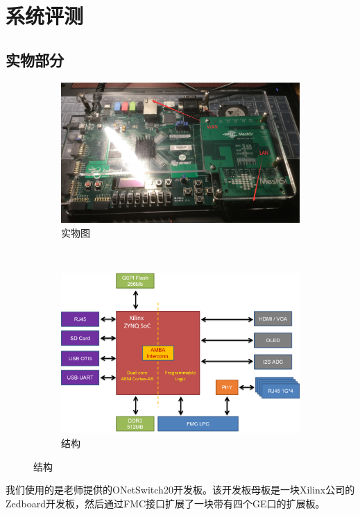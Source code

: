 \documentclass{itecreport-zh}
\begin{document}
\chapter{系统评测}

\section{实物部分}
\begin{figure}[!h]
\centering
  \begin{subfigure}[b]{0.4\textwidth}
  \includegraphics[width=\textwidth]{product.png}
  \caption{实物图}
  \end{subfigure}
~
  \begin{subfigure}[b]{0.4\textwidth}
  \includegraphics[width=\textwidth]{ons20-hw.png}
  \caption{结构}
  \end{subfigure}
\end{figure}
我们使用的是老师提供的ONetSwitch20开发板。该开发板母板是一块Xilinx公司的Zedboard开发板，然后通过FMC接口扩展了一块带有四个GE口的扩展板。
\end{document}
